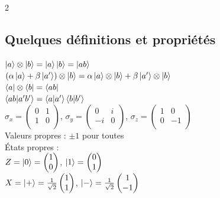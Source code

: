 \documentclass[11pt]{article}
\begin{document}
\begin{multicols}{2}
  \subsection{Quelques définitions et propriétés}
  $\ket{a}\otimes\ket{b} = \ket{a}\ket{b} = \ket{ab}$\\
  $(\alpha\ket{a}+\beta\ket{a'})\otimes\ket{b} = \alpha\ket{a}\otimes\ket{b} + \beta\ket{a'}\otimes\ket{b}$\\
  $\bra{a}\otimes\bra{b} = \bra{ab}$\\
  $\braket{ab|a'b'} = \braket{a|a'}\braket{b|b'}$\\
  $\sigma_x=\begin{pmatrix}
    0&1\\
    1&0\\
  \end{pmatrix}$,
  $\sigma_y=\begin{pmatrix}
    0&i\\
    -i&0\\
  \end{pmatrix}$,
  $\sigma_z=\begin{pmatrix}
    1&0\\
    0&-1\\
  \end{pmatrix}$\\

  Valeurs propres : $\pm 1$ pour toutes\\
  États propres :\\
   $Z=\ket{0}=\begin{pmatrix}
    1\\
    0\\
  \end{pmatrix}$, $\ket{1}=\begin{pmatrix}
    0\\
    1\\
  \end{pmatrix}$\\

  $X=\ket{+}=\frac{1}{\sqrt{2}}\begin{pmatrix}
    1\\
    1\\
  \end{pmatrix}$, $\ket{-}=\frac{1}{\sqrt{2}}\begin{pmatrix}
    1\\
    -1\\
  \end{pmatrix}$\\


\end{multicols}
\end{document}
